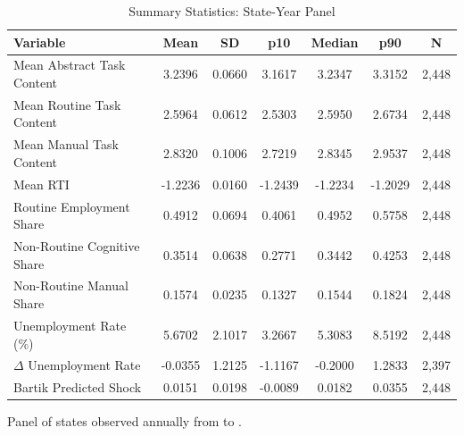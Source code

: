 \begin{table}[htbp]
\centering
\caption{Summary Statistics: State-Year Panel}
\label{tab:summary}
\begin{tabular}{lcccccc}
\hline\hline
Variable & Mean & SD & p10 & Median & p90 & N \\
\hline
Mean Abstract Task Content & 3.2396 & 0.0660 & 3.1617 & 3.2347 & 3.3152 & 2,448 \\
Mean Routine Task Content & 2.5964 & 0.0612 & 2.5303 & 2.5950 & 2.6734 & 2,448 \\
Mean Manual Task Content & 2.8320 & 0.1006 & 2.7219 & 2.8345 & 2.9537 & 2,448 \\
Mean RTI & -1.2236 & 0.0160 & -1.2439 & -1.2234 & -1.2029 & 2,448 \\
Routine Employment Share & 0.4912 & 0.0694 & 0.4061 & 0.4952 & 0.5758 & 2,448 \\
Non-Routine Cognitive Share & 0.3514 & 0.0638 & 0.2771 & 0.3442 & 0.4253 & 2,448 \\
Non-Routine Manual Share & 0.1574 & 0.0235 & 0.1327 & 0.1544 & 0.1824 & 2,448 \\
Unemployment Rate (\%) & 5.6702 & 2.1017 & 3.2667 & 5.3083 & 8.5192 & 2,448 \\
$\Delta$ Unemployment Rate & -0.0355 & 1.2125 & -1.1167 & -0.2000 & 1.2833 & 2,397 \\
Bartik Predicted Shock & 0.0151 & 0.0198 & -0.0089 & 0.0182 & 0.0355 & 2,448 \\
\hline\hline
\end{tabular}
\begin{tablenotes}\small
\item Panel of {\statsNStates} states observed annually from {\statsYearMin} to {\statsYearMax}.
\end{tablenotes}
\end{table}